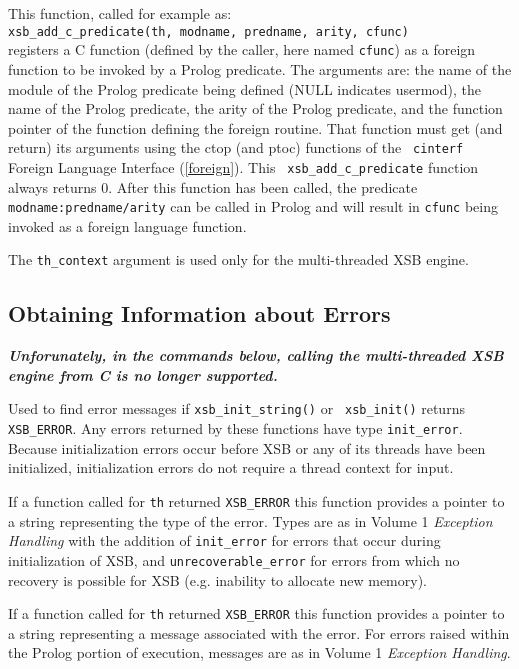 \begin{description}
%
This function, called for example as: \\
{\tt xsb\_add\_c\_predicate(th, modname, predname, arity, cfunc)}\\
registers a C function (defined by the caller, here named {\tt cfunc})
as a foreign function to be invoked by a Prolog predicate.  The
arguments are: the name of the module of the Prolog predicate being
defined (NULL indicates usermod), the name of the Prolog predicate,
the arity of the Prolog predicate, and the function pointer of the
function defining the foreign routine.  That function must get (and
return) its arguments using the ctop (and ptoc) functions of the {\tt
  cinterf} Foreign Language Interface (\ref{foreign}).  This {\tt
  xsb\_add\_c\_predicate} function always returns 0.  After this
function has been called, the predicate {\tt modname:predname/arity}
can be called in Prolog and will result in {\tt cfunc} being invoked
as a foreign language function.

The {\tt th\_context} argument is used only for the multi-threaded XSB engine.

\end{description}

\subsection{Obtaining Information about Errors}
           {\bf {\em Unforunately, in the commands below, calling the multi-threaded XSB engine from C is no longer supported.}}

\begin{description}
%
Used to find error messages if {\tt xsb\_init\_string()} or {\tt
  xsb\_init()} returns {\tt XSB\_ERROR}.  Any errors returned by these
functions have type {\tt init\_error}.  Because initialization errors
occur before XSB or any of its threads have been initialized,
initialization errors do not require a thread context for input.

%
If a function called for {\tt th} returned {\tt XSB\_ERROR} this
function provides a pointer to a string representing the type of the
error.  Types are as in Volume 1 {\em Exception Handling} with the
addition of {\tt init\_error} for errors that occur during
initialization of XSB, and {\tt unrecoverable\_error} for errors from
which no recovery is possible for XSB (e.g. inability to allocate new
memory).  

%
If a function called for {\tt th} returned {\tt XSB\_ERROR} this
function provides a pointer to a string representing a message
associated with the error.  For errors raised within the Prolog
portion of execution, messages are as in Volume 1 {\em Exception
  Handling}.

\end{description}

